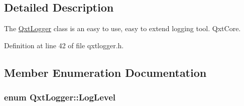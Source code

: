 \subsection{Detailed Description}
The \hyperlink{class_qxt_logger}{Qxt\-Logger} class is an easy to use, easy to extend logging tool.  Qxt\-Core. 



Definition at line 42 of file qxtlogger.\-h.



\subsection{Member Enumeration Documentation}
\hypertarget{class_qxt_logger_ac2071072628aa786466124cc32a324e7}{
\subsubsection[{Log\-Level}]{\setlength{\rightskip}{0pt plus 5cm}enum {\bf Qxt\-Logger\-::\-Log\-Level}}}\label{class_qxt_logger_ac2071072628aa786466124cc32a324e7}
